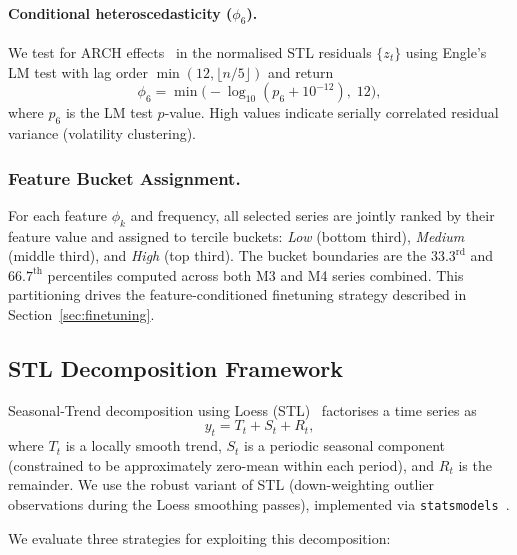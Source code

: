 \documentclass[pdflatex,sn-mathphys-num]{sn-jnl}
\theoremstyle{thmstyleone}
\theoremstyle{thmstyletwo}
\theoremstyle{thmstylethree}
\begin{document}
\paragraph{Conditional heteroscedasticity ($\phi_6$).}
We test for ARCH effects~\cite{engle1982arch} in the normalised STL residuals
$\{z_t\}$ using Engle's LM test with lag order $\min(12, \lfloor n/5 \rfloor)$
and return
\begin{equation}
  \phi_6 = \min\!\bigl(-\log_{10}(p_6 + 10^{-12}),\; 12\bigr),
  \label{eq:phi6}
\end{equation}
where $p_6$ is the LM test $p$-value.
High values indicate serially correlated residual variance (volatility
clustering).

\subsubsection{Feature Bucket Assignment.}\label{sec:buckets}

For each feature $\phi_k$ and frequency, all selected series are jointly ranked
by their feature value and assigned to tercile buckets: \textit{Low} (bottom
third), \textit{Medium} (middle third), and \textit{High} (top third).
The bucket boundaries are the $33.3^{\text{rd}}$ and $66.7^{\text{th}}$
percentiles computed across both M3 and M4 series combined.
This partitioning drives the feature-conditioned finetuning strategy described
in Section~\ref{sec:finetuning}.

\subsection{STL Decomposition Framework}\label{sec:stl}

Seasonal-Trend decomposition using Loess (STL)~\cite{cleveland1990stl}
factorises a time series as
\begin{equation}
  y_t = T_t + S_t + R_t,
  \label{eq:stl}
\end{equation}
where $T_t$ is a locally smooth trend, $S_t$ is a periodic seasonal component
(constrained to be approximately zero-mean within each period), and $R_t$ is
the remainder.
We use the robust variant of STL (down-weighting outlier observations during
the Loess smoothing passes), implemented via \texttt{statsmodels}~\cite{seabold2010}.

We evaluate three strategies for exploiting this decomposition:
\end{document}
